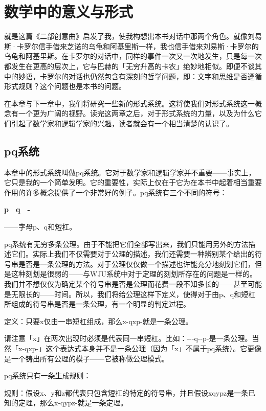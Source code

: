 \documentclass[
  12pt,
  twoside,
  openright,
  oldfontcommands,
]{memoir}
\begin{document}
\label{Chapter02.xhtml}{}

\chapter{数学中的意义与形式}

就是这篇《二部创意曲》启发了我，使我构想出本书对话中那两个角色。就像刘易斯·卡罗尔信手借来芝诺的乌龟和阿基里斯一样，我也信手借来刘易斯·卡罗尔的乌龟和阿基里斯。在卡罗尔的对话中，同样的事件一次又一次地发生，只是每一次都发生在更高的层次上，它与巴赫的「无穷升高的卡农」绝妙地相似。即便不谈其中的妙语，卡罗尔的对话也仍然包含有深刻的哲学问题，即：文字和思维是否遵循形式规则？这个问题也是本书的问题。

在本章与下一章中，我们将研究一些新的形式系统。这将使我们对形式系统这一概念有一个更为广阔的视野。读完这两章之后，对于形式系统的力量，以及为什么它们引起了数学家和逻辑学家的兴趣，读者就会有一个相当清楚的认识了。

\section{pq系统}

本章中的形式系统叫做pq系统。它对于数学家和逻辑学家并不重要------事实上，它只是我的一个简单发明。它的重要性，实际上仅在于它为在本书中起着相当重要作用的许多概念提供了一个非常好的例子。pq系统有三个不同的符号：

\textbf{p　q　-}

------字母p、q和短杠。

pq系统有无穷多条公理。由于不能把它们全部写出来，我们只能用另外的方法描述它们。实际上我们不仅需要对于公理的描述，我们还需要一种辨别某个给出的符号串是否是一条公理的方法。对于公理仅仅做一个描述也许能充分地刻划它们，但是这种刻划是很弱的------与WJU系统中对于定理的刻划所存在的问题是一样的。我们并不想仅仅为确定某个符号串是否是公理而花费一段不知多长的------甚至可能是无限长的------时间。所以，我们将给公理这样下定义，使得对于由p、q和短杠所组成的符号串是否是一条公理，有一个明显的判定过程。

定义：只要x仅由一串短杠组成，那么x-qxp-就是一条公理。

请注意「x」在两次出现时必须是代表同一串短杠。比如：-\/-\/-q-\/-p-是一条公理。当然「x-qxp-」这个表达式本身并不是一条公理（因为「x」不属于pq系统）。它更像是一个铸出所有公理的模子------它被称做公理模式。

pq系统只有一条生成规则：

规则：假设x、y和z都代表只包含短杠的特定的符号串，并且假设xqypz是一条已知的定理，那么x-qypz-就是一条定理。
\end{document}
